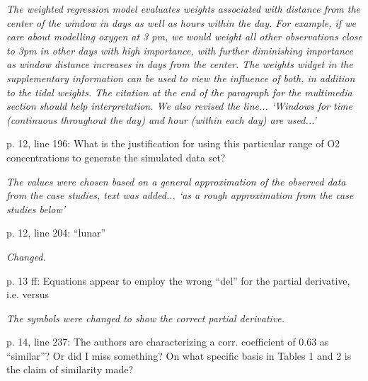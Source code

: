 \documentclass[letterpaper,12pt]{article}\usepackage[]{graphicx}\usepackage[]{color}
\begin{document}
{\it The weighted regression model evaluates weights associated with distance from the center of the window in days as well as hours within the day.  For example, if we care about modelling oxygen at 3 pm, we would weight all other observations close to 3pm in other days with high importance, with further diminishing importance as window distance increases in days from the center.  The weights widget in the supplementary information can be used to view the influence of both, in addition to the tidal weights.  The citation at the end of the paragraph for the multimedia section should help interpretation.  We also revised the line... `Windows for time (continuous throughout the day) and hour (within each day) are used...'
}

p. 12, line 196: What is the justification for using this particular range of O2 concentrations to generate the simulated data set?

{\it The values were chosen based on a general approximation of the observed data from the case studies, text was added... `as a rough approximation from the case studies below'}

p. 12, line 204: “lunar”

{\it Changed.}

p. 13 ff: Equations appear to employ the wrong “del” for the partial derivative, i.e. versus

{\it The symbols were changed to show the correct partial derivative.}

p. 14, line 237: The authors are characterizing a corr. coefficient of 0.63 as “similar”? Or did I
miss something? On what specific basis in Tables 1 and 2 is the claim of similarity made?
\end{document}
